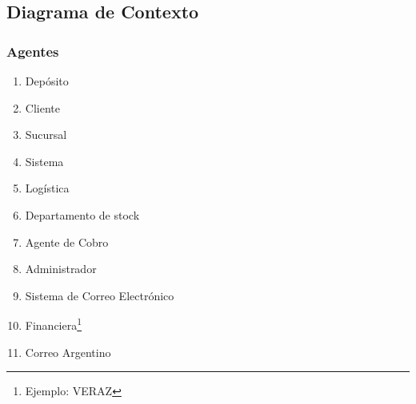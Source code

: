 \subsection{Diagrama de Contexto}

\subsubsection{Agentes}

\begin{enumerate}
  \item Depósito
  \item Cliente
  \item Sucursal
  \item Sistema
  \item Logística
  \item Departamento de stock 
  \item Agente de Cobro
  \item Administrador
  \item Sistema de Correo Electrónico
  \item Financiera\footnote{Ejemplo: VERAZ}
  \item Correo Argentino
\end{enumerate}
\clearpage

